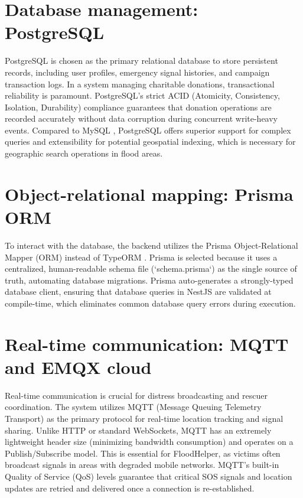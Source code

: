 \documentclass[../Main.tex]{subfiles}
\begin{document}
\section{Database management: PostgreSQL}
PostgreSQL \cite{postgresqlwebsite} is chosen as the primary relational database to store persistent records, including user profiles, emergency signal histories, and campaign transaction logs. In a system managing charitable donations, transactional reliability is paramount. PostgreSQL's strict ACID (Atomicity, Consistency, Isolation, Durability) compliance guarantees that donation operations are recorded accurately without data corruption during concurrent write-heavy events. Compared to MySQL \cite{mysqlwebsite}, PostgreSQL offers superior support for complex queries and extensibility for potential geospatial indexing, which is necessary for geographic search operations in flood areas.

\section{Object-relational mapping: Prisma ORM}
To interact with the database, the backend utilizes the Prisma \cite{prismawebsite} Object-Relational Mapper (ORM) instead of TypeORM \cite{typeormwebsite}. Prisma is selected because it uses a centralized, human-readable schema file (`schema.prisma`) as the single source of truth, automating database migrations. Prisma auto-generates a strongly-typed database client, ensuring that database queries in NestJS are validated at compile-time, which eliminates common database query errors during execution.

\section{Real-time communication: MQTT and EMQX cloud}
Real-time communication is crucial for distress broadcasting and rescuer coordination. The system utilizes MQTT \cite{mqttwebsite} (Message Queuing Telemetry Transport) as the primary protocol for real-time location tracking and signal sharing. Unlike HTTP or standard WebSockets, MQTT has an extremely lightweight header size (minimizing bandwidth consumption) and operates on a Publish/Subscribe model. This is essential for FloodHelper, as victims often broadcast signals in areas with degraded mobile networks. MQTT's built-in Quality of Service (QoS) levels guarantee that critical SOS signals and location updates are retried and delivered once a connection is re-established.
\end{document}

